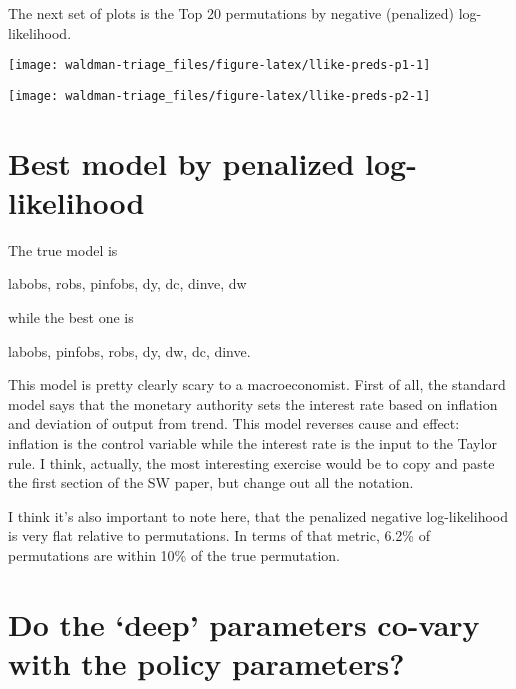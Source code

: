 \documentclass[]{article}
\begin{document}
\clearpage

The next set of plots is the Top 20 permutations by negative (penalized)
log-likelihood.

\begin{center}\texttt{[image: waldman-triage\_files/figure-latex/llike-preds-p1-1]} \end{center}

\begin{center}\texttt{[image: waldman-triage\_files/figure-latex/llike-preds-p2-1]} \end{center}

\clearpage

\hypertarget{best-model-by-penalized-log-likelihood}{%
\section{Best model by penalized
log-likelihood}\label{best-model-by-penalized-log-likelihood}}

The true model is

labobs, robs, pinfobs, dy, dc, dinve, dw

while the best one is

labobs, pinfobs, robs, dy, dw, dc, dinve.

This model is pretty clearly scary to a macroeconomist. First of all,
the standard model says that the monetary authority sets the interest
rate based on inflation and deviation of output from trend. This model
reverses cause and effect: inflation is the control variable while the
interest rate is the input to the Taylor rule. I think, actually, the
most interesting exercise would be to copy and paste the first section
of the SW paper, but change out all the notation.

I think it's also important to note here, that the penalized negative
log-likelihood is very flat relative to permutations. In terms of that
metric, 6.2\% of permutations are within 10\% of the true permutation.

\hypertarget{do-the-deep-parameters-co-vary-with-the-policy-parameters}{%
\section{Do the `deep' parameters co-vary with the policy
parameters?}\label{do-the-deep-parameters-co-vary-with-the-policy-parameters}}
\end{document}
